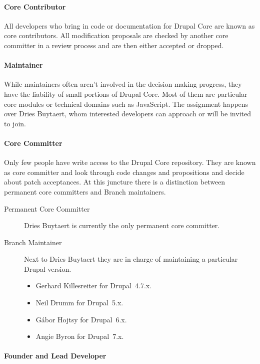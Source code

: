 \paragraph{Core Contributor}

All developers who bring in code or documentation for Drupal Core are known as
core contributors. All modification proposals are checked by another core
committer in a review process and are then either accepted or dropped.

\paragraph{Maintainer}

While maintainers often aren't involved in the decision making progress, they
have the liability of small portions of Drupal Core. Most of them are
particular core modules or technical domains such as JavaScript. The assignment
happens over Dries Buytaert, whom interested developers can approach or will be
invited to join.

\paragraph{Core Committer}

Only few people have write access to the Drupal Core repository. They are known
as core committer and look through code changes and propositions and decide
about patch acceptances. At this juncture there is a distinction between
permanent core committers and Branch maintainers.

\begin{description}
  \item[Permanent Core Committer] Dries Buytaert is currently the only permanent core
    committer.
  \item[Branch Maintainer] Next to Dries Buytaert they are in charge of
  maintaining a particular Drupal version.
  \begin{itemize}
    \item Gerhard Killesreiter for Drupal~4.7.x.
    \item Neil Drumm for Drupal~5.x.
    \item Gábor Hojtsy for Drupal~6.x.
    \item Angie Byron for Drupal~7.x.
  \end{itemize}
\end{description}

\paragraph{Founder and Lead Developer}

